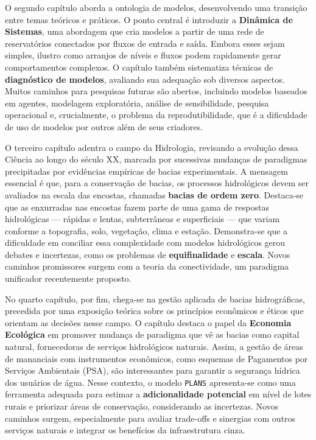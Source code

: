 \documentclass[./main.tex]{subfiles}
\begin{document}
\par O segundo capítulo aborda a ontologia de modelos, desenvolvendo uma transição entre temas teóricos e práticos. O ponto central é introduzir a \textbf{Dinâmica de Sistemas}, uma abordagem que cria modelos a partir de uma rede de reservatórios conectados por fluxos de entrada e saída. Embora esses  sejam simples, ilustro como arranjos de níveis e fluxos podem rapidamente gerar comportamentos complexos. O capítulo também sistematiza técnicas de \textbf{diagnóstico de modelos}, avaliando sua adequação sob diversos aspectos. Muitos caminhos para pesquisas futuras são abertos, incluindo modelos baseados em agentes, modelagem exploratória, análise de sensibilidade, pesquisa operacional e, crucialmente, o problema da reprodutibilidade, que é a dificuldade de uso de modelos por outros além de seus criadores.

\par O terceiro capítulo adentra o campo da Hidrologia, revisando a evolução dessa Ciência ao longo do século XX, marcada por sucessivas mudanças de paradigmas precipitadas por evidências empíricas de bacias experimentais. A mensagem essencial é que, para a conservação de bacias, os processos hidrológicos devem ser avaliados na escala das encostas, chamadas \textbf{bacias de ordem zero}. Destaca-se que as enxurradas nas encostas fazem parte de uma gama de respostas hidrológicas — rápidas e lentas, subterrâneas e superficiais — que variam conforme a topografia, solo, vegetação, clima e estação. Demonstra-se que a dificuldade em conciliar essa complexidade com modelos hidrológicos gerou debates e incertezas, como os problemas de \textbf{equifinalidade} e \textbf{escala}. Novos caminhos promissores surgem com a teoria da conectividade, um paradigma unificador recentemente proposto.

\par No quarto capítulo, por fim, chega-se na gestão aplicada de bacias hidrográficas, precedida por uma exposição teórica sobre os princípios econômicos e éticos que orientam as decisões nesse campo. O capítulo destaca o papel da \textbf{Economia Ecológica} em promover mudança de paradigma que vê as bacias como capital natural, fornecedoras de serviços hidrológicos naturais. Assim, a gestão de áreas de mananciais com instrumentos econômicos, como esquemas de Pagamentos por Serviços Ambientais (PSA), são interessantes para garantir a segurança hídrica dos usuários de água. Nesse contexto, o modelo \texttt{PLANS} apresenta-se como uma ferramenta adequada para estimar a \textbf{adicionalidade potencial} em nível de lotes rurais e priorizar áreas de conservação, considerando as incertezas. Novos caminhos surgem, especialmente para avaliar trade-offs e sinergias com outros serviços naturais e integrar os benefícios da infraestrutura cinza.
\end{document}
